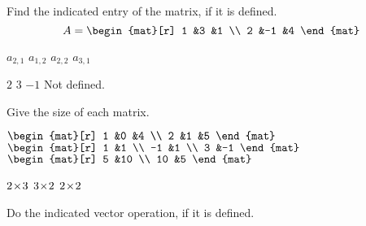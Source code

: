 \begin{exercises}
  \recommended \item  
    Find the indicated entry of the matrix,
    if it is defined.
    \begin{equation*}
      A=\begin{mat}[r]
        1  &3  &1  \\
        2  &-1 &4
      \end{mat}
    \end{equation*}
    \begin{exparts*}
      \partsitem \( a_{2,1} \)
      \partsitem \( a_{1,2} \)
      \partsitem \( a_{2,2} \)
      \partsitem \( a_{3,1} \)
    \end{exparts*}
    \begin{answer}
      \begin{exparts*}
        \partsitem \( 2 \)
        \partsitem \( 3 \)
        \partsitem \(-1 \)
        \partsitem Not defined.
      \end{exparts*}  
    \end{answer}
  \recommended \item 
    Give the size of each matrix.
    \begin{exparts*}
      \partsitem \(
        \begin{mat}[r]
          1  &0  &4  \\
          2  &1  &5
        \end{mat}  \)
      \partsitem \(
        \begin{mat}[r]
          1  &1  \\
         -1  &1  \\
          3  &-1
        \end{mat}  \)
      \partsitem \(
        \begin{mat}[r]
          5  &10 \\
         10  &5
        \end{mat}  \)
    \end{exparts*}
    \begin{answer}
      \begin{exparts*}
        \partsitem \( 2 \! \times \! 3 \)
        \partsitem \( 3 \! \times \! 2 \)
        \partsitem \( 2 \! \times \! 2 \)
      \end{exparts*}  
    \end{answer}
  \recommended \item 
    Do the indicated vector operation, if it is defined.
\end{exercises}
